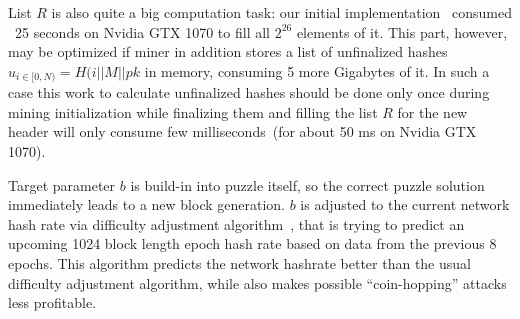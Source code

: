 List $R$ is also quite a big computation task: our initial implementation~\cite{ergoMiner}
consumed ~25 seconds on Nvidia GTX 1070 to fill all $2^{26}$ elements of it.
This part, however, may be optimized if miner in addition stores a list of unfinalized hashes $u_{i \in [0,N)}=H(i||M||pk$
in memory, consuming 5 more Gigabytes of it. In such a case this work to calculate unfinalized hashes should
be done only once during mining initialization while finalizing them and filling the list $R$
for the new header will only consume few milliseconds~(for about 50 ms on Nvidia GTX 1070).

Target parameter $b$ is build-in into puzzle itself, so the correct puzzle solution immediately
leads to a new block generation. $b$ is adjusted to the current network hash rate via difficulty adjustment
algorithm~\cite{meshkov2017short}, that is trying to predict an upcoming 1024 block length
epoch hash rate based on data from the previous 8 epochs.
This algorithm predicts the network hashrate better than the usual difficulty adjustment algorithm,
while also makes possible ``coin-hopping'' attacks less profitable.
